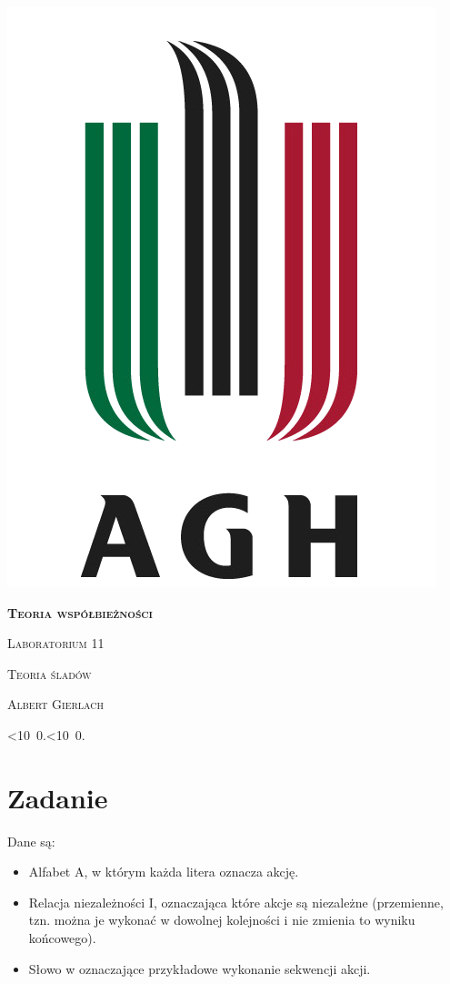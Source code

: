 \documentclass[12pt]{article}
\def\mydate{\leavevmode\hbox{\twodigits\day.\twodigits\month.\the\year}}
\def\twodigits#1{\ifnum#1<10 0\fi\the#1}
\begin{document}
\thispagestyle{empty}
\begin{center}
\begin{minipage}{0.75\linewidth}
    \centering
    \includegraphics[width=0.45\linewidth]{agh_logo2.png}
    \par
    \vspace{2cm}
    {\bfseries{\scshape{\Huge  Teoria współbieżności}}}
    \par
    \vspace{1.7cm}
    {\scshape{\Large Laboratorium 11}}
    \par
    \vspace{0.8cm}
    {\scshape{\Large Teoria śladów}}
    \par
    \vspace{3cm}

    {\scshape{\Large Albert Gierlach}}\par
    \vspace{1cm}

    {\Large \mydate}
\end{minipage}
\end{center}
\clearpage



\section{Zadanie}
Dane są:

\begin{itemize}
    \item Alfabet A, w którym każda litera oznacza akcję.
    \item Relacja niezależności I, oznaczająca które akcje są niezależne (przemienne, tzn. można je wykonać w dowolnej kolejności i nie zmienia to wyniku końcowego).
    \item Słowo w oznaczające przykładowe wykonanie sekwencji akcji.
\end{itemize}
\end{document}
